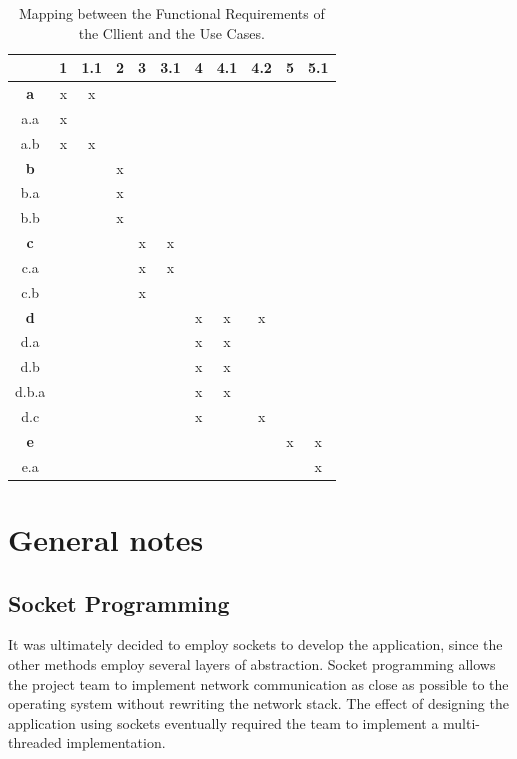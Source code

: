 \documentclass[finalReport.tex]{subfiles}
\begin{document}
\begin{table}\centering
\begin{tabular}{|c|c|c|c|c|c|c|c|c|c|c|}
\hline 
 & \textbf{1} & 1.1 & \textbf{2} & \textbf{3} & 3.1 & \textbf{4} & 4.1 & 4.2 & \textbf{5} & 5.1 \\ 
\hline 
\textbf{a} & x & x &  &  &  &  &  &  &  &  \\ 
\hline 
a.a & x &  &  &  &  &  &  &  &  &  \\ 
\hline 
a.b & x & x &  &  &  &  &  &  &  &  \\ 
\hline 
\textbf{b} &  &  & x &  &  &  &  &  &  &  \\ 
\hline 
b.a &  &  & x &  &  &  &  &  &  &  \\ 
\hline 
b.b &  &  & x &  &  &  &  &  &  &  \\ 
\hline 
\textbf{c} &  &  &  & x & x &  &  &  &  &  \\ 
\hline 
c.a &  &  &  & x & x &  &  &  &  &  \\ 
\hline 
c.b &  &  &  & x &  &  &  &  &  &  \\ 
\hline 
\textbf{d} &  &  &  &  &  & x & x & x &  &  \\ 
\hline 
d.a &  &  &  &  &  & x & x &  &  &  \\ 
\hline 
d.b &  &  &  &  &  & x & x &  &  &  \\ 
\hline 
d.b.a &  &  &  &  &  & x & x &  &  &  \\ 
\hline 
d.c &  &  &  &  &  & x &  & x &  &  \\ 
\hline 
\textbf{e} &  &  &  &  &  &  &  &  & x & x \\ 
\hline 
e.a &  &  &  &  &  &  &  &  &  & x \\ 
\hline 
\end{tabular} 
\caption{Mapping between the Functional Requirements of the Cllient and the Use Cases.}\label{Tab:FRvsUC_client}
\end{table}


\section{General notes}\label{sec:notes}

\subsection{Socket Programming}
It was ultimately decided to employ sockets to develop the application, since the other methods employ several layers of abstraction. Socket programming allows the project team to implement network communication as close as possible to the operating system without rewriting the network stack. The effect of designing the application using sockets eventually required the team to implement a multi-threaded implementation.
\end{document}
